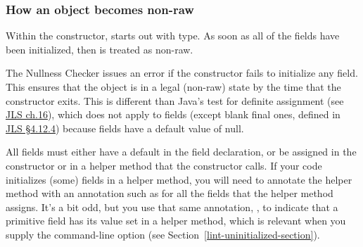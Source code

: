 

\subsubsection{How an object becomes non-raw\label{becoming-non-raw}}

Within the constructor,
 starts out with  type.
As soon as all of the  fields
have been initialized, then  is treated as non-raw.

The Nullness Checker issues an error if the constructor fails to initialize
any  field.  This ensures that the object is in a legal (non-raw)
state by the time that the constructor exits.
This is different than Java's test for definite assignment (see
\href{https://docs.oracle.com/javase/specs/jls/se8/html/jls-16.html}{JLS ch.16}),
which does not apply to fields (except blank final ones, defined in
\href{https://docs.oracle.com/javase/specs/jls/se8/html/jls-4.html#jls-4.12.4}{JLS \S 4.12.4}) because fields
have a default value of null.



All  fields must either have a
default in the field declaration, or be assigned in the constructor or in a
helper method that the constructor calls.  If
your code initializes (some) fields in a helper method, you will need to
annotate the helper method with an annotation such as
for all the fields that the helper method assigns.
It's a bit odd, but you use that same annotation, ,
to indicate that a primitive field has its value set in a helper method,
which is relevant when you supply the 
command-line option (see Section~\ref{lint-uninitialized-section}).



